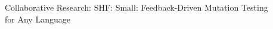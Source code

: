 \documentclass[11pt]{article}
\begin{document}
\begin{center}
  \huge Collaborative Research: SHF: Small: Feedback-Driven Mutation Testing\\for Any Language
\end{center}













\newpage
\setcounter{page}{1}



\end{document}
